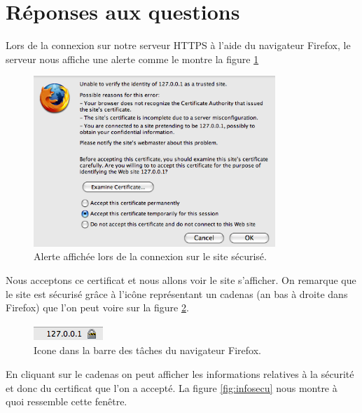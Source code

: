 \documentclass[10pt,a4paper,titlepage]{article}
\begin{document}
\section{Réponses aux questions}

Lors de la connexion sur notre serveur HTTPS à l'aide du navigateur Firefox, le serveur nous affiche une alerte comme le montre la figure \ref{fig:connex}

\begin{figure}[htbp]
   \begin{center}
      \includegraphics[width=345px]{img/1.png}
   \end{center}
   \caption{Alerte affichée lors de la connexion sur le site sécurisé.}
	\label{fig:connex}
\end{figure}

Nous acceptons ce certificat et nous allons voir le site s'afficher. On remarque que le site est sécurisé grâce à l'icône représentant un cadenas (an bas à droite dans Firefox) que l'on peut voire sur la figure \ref{fig:icone}.

\begin{figure}[htbp]
   \begin{center}
      \includegraphics[height=23px]{img/2.png}
   \end{center}
   \caption{Icone dans la barre des tâches du navigateur Firefox.}
	\label{fig:icone}
\end{figure}

En cliquant sur le cadenas on peut afficher les informations relatives à la sécurité et donc du certificat que l'on a accepté. La figure \ref{fig:infosecu} nous montre à quoi ressemble cette fenêtre.
\end{document}
